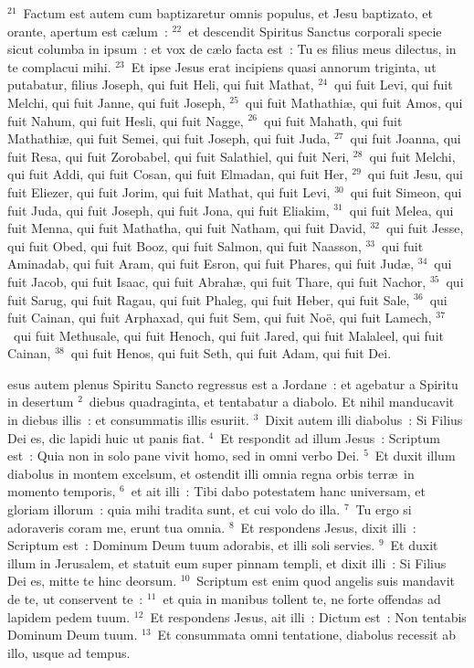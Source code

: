 ${}^{21}$~Factum est autem cum baptizaretur omnis populus, et Jesu baptizato, et orante, apertum est c\ae lum~:
${}^{22}$~et descendit Spiritus Sanctus corporali specie sicut columba in ipsum~: et vox de c\ae lo facta est~: Tu es filius meus dilectus, in te complacui mihi.
${}^{23}$~Et ipse Jesus erat incipiens quasi annorum triginta, ut putabatur, filius Joseph, qui fuit Heli, qui fuit Mathat,
${}^{24}$~qui fuit Levi, qui fuit Melchi, qui fuit Janne, qui fuit Joseph,
${}^{25}$~qui fuit Mathathi\ae , qui fuit Amos, qui fuit Nahum, qui fuit Hesli, qui fuit Nagge,
${}^{26}$~qui fuit Mahath, qui fuit Mathathi\ae , qui fuit Semei, qui fuit Joseph, qui fuit Juda,
${}^{27}$~qui fuit Joanna, qui fuit Resa, qui fuit Zorobabel, qui fuit Salathiel, qui fuit Neri,
${}^{28}$~qui fuit Melchi, qui fuit Addi, qui fuit Cosan, qui fuit Elmadan, qui fuit Her,
${}^{29}$~qui fuit Jesu, qui fuit Eliezer, qui fuit Jorim, qui fuit Mathat, qui fuit Levi,
${}^{30}$~qui fuit Simeon, qui fuit Juda, qui fuit Joseph, qui fuit Jona, qui fuit Eliakim,
${}^{31}$~qui fuit Melea, qui fuit Menna, qui fuit Mathatha, qui fuit Natham, qui fuit David,
${}^{32}$~qui fuit Jesse, qui fuit Obed, qui fuit Booz, qui fuit Salmon, qui fuit Naasson,
${}^{33}$~qui fuit Aminadab, qui fuit Aram, qui fuit Esron, qui fuit Phares, qui fuit Jud\ae ,
${}^{34}$~qui fuit Jacob, qui fuit Isaac, qui fuit Abrah\ae , qui fuit Thare, qui fuit Nachor,
${}^{35}$~qui fuit Sarug, qui fuit Ragau, qui fuit Phaleg, qui fuit Heber, qui fuit Sale,
${}^{36}$~qui fuit Cainan, qui fuit Arphaxad, qui fuit Sem, qui fuit No\"e, qui fuit Lamech,
${}^{37}$~qui fuit Methusale, qui fuit Henoch, qui fuit Jared, qui fuit Malaleel, qui fuit Cainan,
${}^{38}$~qui fuit Henos, qui fuit Seth, qui fuit Adam, qui fuit Dei.

\bchapter
{}esus autem plenus Spiritu Sancto regressus est a Jordane~: et agebatur a Spiritu in desertum
${}^{2}$~diebus quadraginta, et tentabatur a diabolo. Et nihil manducavit in diebus illis~: et consummatis illis esuriit.
${}^{3}$~Dixit autem illi diabolus~: Si Filius Dei es, dic lapidi huic ut panis fiat.
${}^{4}$~Et respondit ad illum Jesus~: Scriptum est~: Quia non in solo pane vivit homo, sed in omni verbo Dei.
${}^{5}$~Et duxit illum diabolus in montem excelsum, et ostendit illi omnia regna orbis terr\ae\ in momento temporis,
${}^{6}$~et ait illi~: Tibi dabo potestatem hanc universam, et gloriam illorum~: quia mihi tradita sunt, et cui volo do illa.
${}^{7}$~Tu ergo si adoraveris coram me, erunt tua omnia.
${}^{8}$~Et respondens Jesus, dixit illi~: Scriptum est~: Dominum Deum tuum adorabis, et illi soli servies.
${}^{9}$~Et duxit illum in Jerusalem, et statuit eum super pinnam templi, et dixit illi~: Si Filius Dei es, mitte te hinc deorsum.
${}^{10}$~Scriptum est enim quod angelis suis mandavit de te, ut conservent te~:
${}^{11}$~et quia in manibus tollent te, ne forte offendas ad lapidem pedem tuum.
${}^{12}$~Et respondens Jesus, ait illi~: Dictum est~: Non tentabis Dominum Deum tuum.
${}^{13}$~Et consummata omni tentatione, diabolus recessit ab illo, usque ad tempus.


